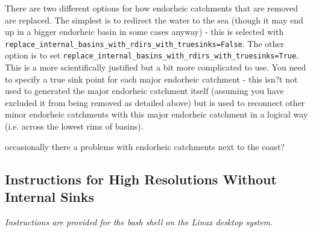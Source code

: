 \documentclass{article}
\begin{document}
There are two different options for how endorheic catchments that are removed are replaced. The simplest is to redirect the water to the sea (though it may end up in a bigger endorheic basin in some cases anyway) - this is selected with \lstinline[style=bash_input]{replace_internal_basins_with_rdirs_with_truesinks=False}. The other option is to set \lstinline[style=bash_input]{replace_internal_basins_with_rdirs_with_truesinks=True}. This is a more scientifically justified but a bit more complicated to use. You need to specify a true sink point for each major endorheic catchment - this isn?t not used to generated the major endorheic catchment itself (assuming you have excluded it from being removed as detailed above) but is used to reconnect other minor endorheic catchments with this major endorheic catchment in a logical way (i.e. across the lowest rims of basins). 

occasionally there a problems with endorheic catchments next to the coast?
\subsection{Instructions for High Resolutions Without Internal Sinks}

\emph{Instructions are provided for the bash shell on the Linux desktop system.}
\end{document}
